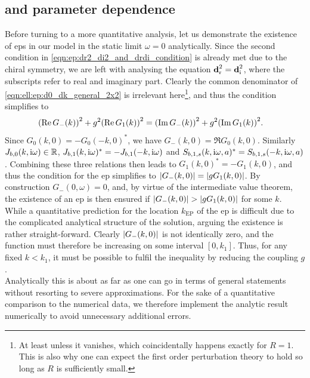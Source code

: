 \subsection{\texorpdfstring{}{EP} and parameter dependence}\label{sec:ell:ep:parameter_plots}
Before turning to a more quantitative analysis, let us demonstrate the existence of \glspl{ep} in our model in the static limit $\omega=0$ analytically.
Since the second condition in \autoref{eqn:ep:dr2_di2_and_drdi_condition} is already met due to the chiral symmetry, we are left with analysing the equation $\textbf{d}_\r^2 = \textbf{d}_\i^2$, where the subscripts refer to real and imaginary part.
Clearly the common denominator of \autoref{eqn:ell:ep:d0_dk_general_2x2} is irrelevant here\footnote{At least unless it vanishes, which coincidentally happens exactly for $R=1$. This is also why one can expect the first order perturbation theory to hold so long as $R$ is sufficiently small.}, and thus the condition simplifies to
\begin{align*}
\kla*{\Re G_-(k)}^2 + g^2 \kla*{\Re G_1(k)}^2 &= \kla*{\Im G_-(k)}^2 + g^2 \kla*{\Im G_1(k)}^2.
\end{align*}
Since $G_0(k,0)=-G_0(-k,0)^\ast$, we have $G_-(k,0) = \Re G_0(k,0)$.
Similarly $J_{b,0}(k,\i\omega)\in\mathbb{R}$, $J_{b,1}(k,\i\omega)^\ast = -J_{b,1}(-k,\i\omega)$ and $S_{b,1,s}(k,\i\omega,a)^\ast = S_{b,1,s}(-k,\i\omega,a)$.
Combining these three relations then leads to $G_1(k,0)^\ast = -G_1(k,0)$, and thus the condition for the \gls{ep} simplifies to $\abs*{G_-(k,0)} = \abs*{g G_1(k,0)}$.
By construction $G_-(0,\omega)=0$, and, by virtue of the intermediate value theorem, the existence of an \gls{ep} is then ensured if $\abs*{G_-(k,0)}>\abs*{g G_1(k,0)}$ for some $k$.
While a quantitative prediction for the location $k_\text{EP}$ of the \gls{ep} is difficult due to the complicated analytical structure of the solution, arguing the existence is rather straight-forward.
Clearly $\abs*{G_-(k,0)}$ is not identically zero, and the function must therefore be increasing on some interval $[0,k_1]$.
Thus, for any fixed $k<k_1$, it must be possible to fulfil the inequality by reducing the coupling $g$.\\
Analytically this is about as far as one can go in terms of general statements without resorting to severe approximations.
For the sake of a quantitative comparison to the numerical data, we therefore implement the analytic result numerically to avoid unnecessary additional errors.\\
